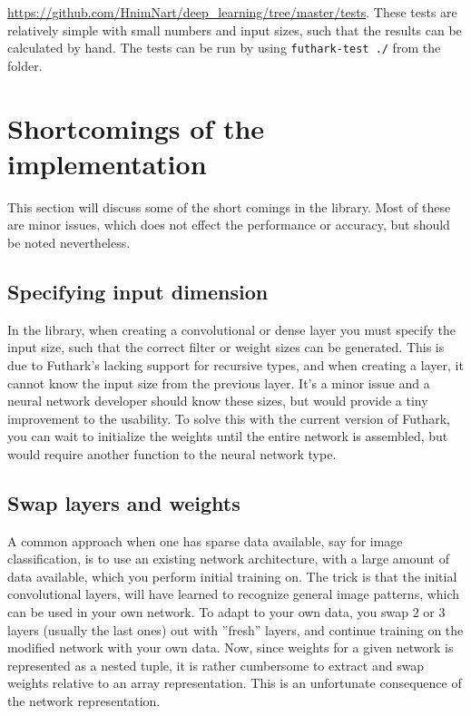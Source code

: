 {{\url{https://github.com/HnimNart/deep_learning/tree/master/tests}}. 
	These tests are relatively simple with small numbers and input sizes, such that
	the results can be calculated by hand. 
	The tests can be run by using \texttt{futhark-test ./} from the folder. 
	\section{Shortcomings of the implementation}
	\label{shortcoming}
	This section will discuss some of the short comings in the library. 
	Most of these are minor issues, which does not effect the performance or
	accuracy, but should be noted nevertheless.
	
	
	\subsection{Specifying input dimension}
	In the library, when creating a convolutional or dense layer you must specify
	the input size, such that the correct filter or weight sizes can be generated. 
	This is due to Futhark's lacking support for recursive types, and when creating
	a layer, it cannot know the input size from the previous layer. 
	It's a minor issue and a neural network developer should know these sizes, but 
	would provide a tiny improvement to the usability. 
	To solve this with the current version of Futhark, you can wait to initialize
	the weights until the entire network is assembled, but would require another
	function to the neural network type. 
	
	\subsection{Swap layers and weights}
	A common approach when one has sparse data available, say for image
	classification, is to use an existing network architecture, with a large amount
	of data available, which you perform initial training on. 
	The trick is that the initial convolutional layers, will have learned to
	recognize general image patterns, which can be used in your own network. 
	To adapt to your own data, you swap 2 or 3 layers (usually the last ones) out
	with ''fresh'' layers, and continue training on the modified network with your
	own data. 
	Now, since weights for a given network is represented as a nested tuple, it is
	rather cumbersome to extract and swap weights relative to an array
	representation. 
	This is an unfortunate consequence of the network representation. 
	
}
